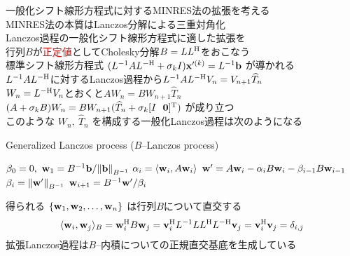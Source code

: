

一般化シフト線形方程式に対するMINRES法の拡張を考える\\
\myitem MINRES法の本質はLanczos分解による三重対角化\\
\myitem Lanczos過程の一般化シフト線形方程式に適した拡張を\\
行列$B$が\textcolor{red}{正定値}としてCholesky分解$B=LL^{\mathrm{H}}$をおこなう\\
\myitem 標準シフト線形方程式 $(L^{-1}AL^{-\mathrm{H}} + \sigma_{k}I)\vb{x}'^{(k)} = L^{-1}\vb{b}$ が導かれる\\
\myitem $L^{-1}AL^{-\mathrm{H}}$に対するLanczos過程から$L^{-1}AL^{-\mathrm{H}}V_{n} = V_{n+1}\widehat{T}_{n}$\\
\myitem $W_{n} = L^{-\mathrm{H}}V_{n}$とおくと$AW_{n}=BW_{n+1}\widehat{T}_{n}$\\
\myitem $(A+\sigma_{k}B)W_{n}=BW_{n+1}(\widehat{T}_{n} + \sigma_{k}[I \ \  \vb{0}]^{\mathrm{T}})$ が成り立つ\\
このような $W_{n},\ \widehat{T}_{n}$ を構成する一般化Lanczos過程は次のようになる
\vspace{0.2\baselineskip}
\begin{algorithm}[H]
   \caption{ Generalized Lanczos process ($B$--Lanczos process)}
   \label{alg-ex-lanczos}
   \begin{algorithmic}[1]
   	\vspace{-0.4\baselineskip}
   	\State $\beta_0 = 0,\ \vb{w}_1 = B^{-1}\vb{b} / \norm{\vb{b}}_{B^{-1}}$
   		\State $\alpha_i = \langle \vb{w}_i, A\vb{w}_i \rangle$
   		\State $\vb{w}' = A\vb{w}_i - \alpha_i B\vb{w}_i - \beta_{i-1} B \vb{w}_{i-1}$
   		\State $\beta_i = \norm{\vb{w}'}_{B^{-1}}$
   		\State $\vb{w}_{i+1} = B^{-1}\vb{w}' / \beta_i$
   	\EndFor
   \end{algorithmic}
\end{algorithm}

得られる $\{ \vb{w}_{1}, \vb{w}_{2}, \dots, \vb{w}_{n} \}$ は行列$B$について直交する
\begin{align}
	\langle \vb{w}_{i}, \vb{w}_{j} \rangle_{B} = \vb{w}_{i}^{\mathrm{H}} B \vb{w}_{j} = \vb{v}_{i}^{\mathrm{H}} L^{-1} LL^{\mathrm{H}} L^{-\mathrm{H}} \vb{v}_{j} = \vb{v}_{i}^{\mathrm{H}} \vb{v}_{j} = \delta_{i,j}
\end{align}
\myitem 拡張Lanczos過程は$B$--内積についての正規直交基底を生成している


